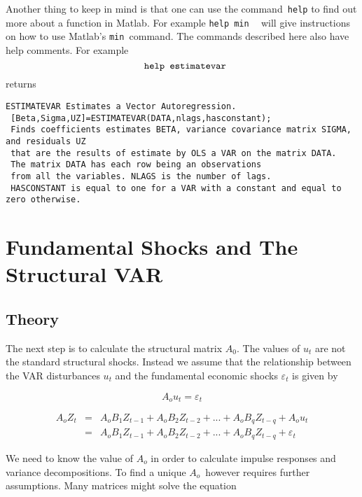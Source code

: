 \documentclass{article}
\begin{document}
Another thing to keep in mind is that one can use the command\texttt{\ help}
to find out more about a function in Matlab. For example \texttt{help min }$%
\ $\ will give instructions on how to use Matlab's \texttt{min }command. The
commands described here also have help comments. For example 
\begin{equation*}
\text{\texttt{help estimatevar}}
\end{equation*}
returns
\begin{verbatim}
ESTIMATEVAR Estimates a Vector Autoregression.
 [Beta,Sigma,UZ]=ESTIMATEVAR(DATA,nlags,hasconstant);
 Finds coefficients estimates BETA, variance covariance matrix SIGMA, and residuals UZ
 that are the results of estimate by OLS a VAR on the matrix DATA.
 The matrix DATA has each row being an observations
 from all the variables. NLAGS is the number of lags.
 HASCONSTANT is equal to one for a VAR with a constant and equal to zero otherwise.
\end{verbatim}

\section{Fundamental Shocks and The Structural VAR}

\subsection{Theory}

The next step is to calculate the structural matrix $A_{0}$. The values of $%
u_{t}$ are not the standard structural shocks. Instead we assume that the
relationship between the VAR disturbances $u_{t}$ and the fundamental
economic shocks $\varepsilon _{t}$ is given by

\begin{equation*}
A_{o}u_{t}=\varepsilon _{t}
\end{equation*}

\begin{eqnarray*}
A_{o}Z_{t}
&=&A_{o}B_{1}Z_{t-1}+A_{o}B_{2}Z_{t-2}+...+A_{o}B_{q}Z_{t-q}+A_{o}u_{t} \\
&=&A_{o}B_{1}Z_{t-1}+A_{o}B_{2}Z_{t-2}+...+A_{o}B_{q}Z_{t-q}+\varepsilon _{t}
\end{eqnarray*}

We need to know the value of $A_{o}$ in order to calculate impulse responses
and variance decompositions. To find a unique $A_{o}$\ however requires
further assumptions. Many matrices might solve the equation
\end{document}
